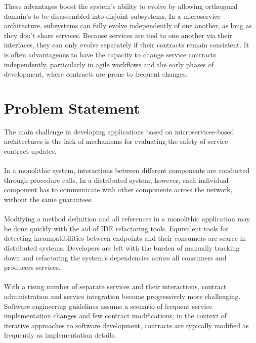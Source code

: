 These advantages boost the system's ability to evolve by allowing orthogonal domain's to be disassembled into disjoint subsystems.
In a microservice architecture, subsystems can fully evolve independently of one another, as long as they don't share services.
Because services are tied to one another via their interfaces, they can only evolve separately if their contracts remain consistent.
It is often advantageous to have the capacity to change service contracts independently,
particularly in agile workflows and the early phases of development, where contracts are prone to frequent changes.

\section{Problem Statement} %
\label{sec:problem_statement}

The main challenge in developing applications based on microservices-based architectures is the lack of mechanisms for evaluating the safety of service contract updates.

\paragraph{}

In a monolithic system, interactions between different components are conducted through procedure calls.
In a distributed system, however, each individual component has to communicate with other components across the network,
without the same guarantees.

\paragraph{}

Modifying a method definition and all references in a monolithic application may be done quickly with the aid of IDE refactoring tools.
Equivalent tools for detecting incompatibilities between endpoints and their consumers are scarce in distributed systems.
Developers are left with the burden of manually tracking down and refactoring the system's dependencies across all consumers and producers services.

\paragraph{}

With a rising number of separate services and their interactions, contract administration and service integration become progressively more challenging.
Software engineering guidelines assume a scenario of frequent service implementation changes and few contract modifications;
in the context of iterative approaches to software development, contracts are typically modified as frequently as implementation details.

